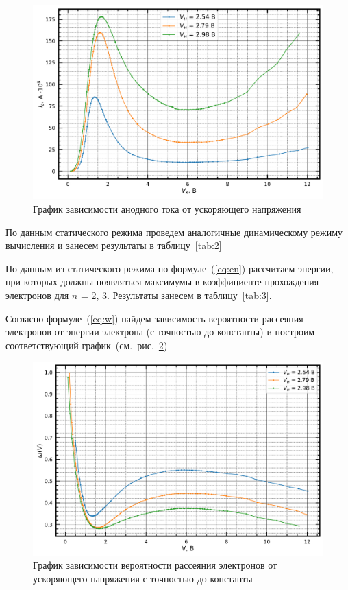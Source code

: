 \documentclass[reprint, nofootinbib, nobalancelastpage, 10pt]{revtex4-2}
\begin{document}
\begin{figure}[h!]
	\includegraphics[width = \linewidth]{vah.pdf}
	\caption{График зависимости анодного тока от ускоряющего напряжения}
	\label{graph:plot1}
\end{figure}

По данным статического режима проведем аналогичные динамическому режиму вычисления и занесем
результаты в таблицу~\ref{tab:2}

По данным из статического режима по формуле~(\ref{eq:en}) рассчитаем энергии, при которых
должны появляться максимумы в коэффициенте прохождения электронов для $n$ = 2, 3.
Результаты занесем в таблицу~\ref{tab:3}.

Согласно формуле~(\ref{eq:w}) найдем зависимость вероятности рассеяния электронов от энергии электрона
(с точностью до константы) и построим соответствующий график~(см.~рис.~\ref{graph:plot2})

\begin{figure}[h!]
	\includegraphics[width = \linewidth]{w.pdf}
	\caption{График зависимости вероятности рассеяния электронов от ускоряющего напряжения с точностью до константы}
	\label{graph:plot2}
\end{figure}
\end{document}
